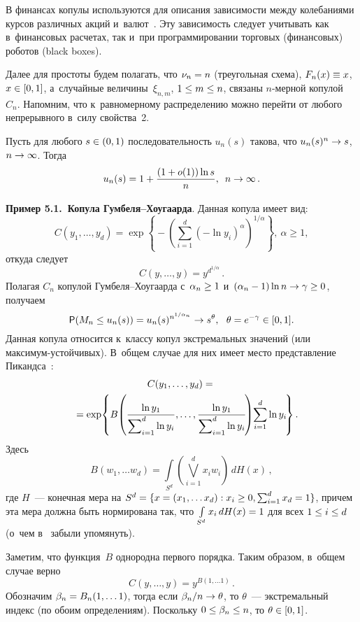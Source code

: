 \begin{multicols}{2}
В финансах копулы используются для описания зависимости между колебаниями курсов различных
акций и~валют~\cite{QRM}. Эту зависимость следует учитывать как в~финансовых расчетах,
 так и~при программировании торговых (финансовых) роботов (black boxes).

Далее для простоты будем полагать, что $\nu_n\hm=n$ (треугольная схема),
$F_n(x)\hm\equiv x$,
$x\hm\in [0,1]$, а~случайные величины~$\xi_{n,m}$, $1\hm\le m\hm\le n$,
связаны $n$-мер\-ной копулой~$C_n$.
Напомним, что к~равномерному распределению можно перейти от любого непрерывного в~силу
свойства~2.

Пусть для любого $s\hm\in (0,1)$ последовательность $u_n(s)$ такова,
что $u_n(s)^n\hm\to s$, $n\hm\to\infty$.
Тогда 
$$
u_n(s)=1+\displaystyle\frac{\displaystyle (1+o(1))\ln s\mathstrut}{\displaystyle n\mathstrut},\enskip n\to\infty\,.
$$

\smallskip

\noindent
\textbf{Пример 5.1.\ Копула Гум\-бе\-ля--Хоу\-га\-ар\-да}.
Данная копула имеет вид:
$$
C(y_1,\dots,y_d)=\exp\left\{\!-\left(\sum\limits_{i=1}^d(-\ln y_i)^\alpha
\right)^{\!\!1/\alpha}\right\}\!,\  \alpha\ge 1,
$$
откуда следует
$$
C(y,\dots,y)=y^{d^{1/\alpha}}\,.
$$
Полагая $C_n$ копулой Гум\-бе\-ля--Хоу\-га\-ар\-да
с~$\alpha_n\hm\ge 1$ и~$(\alpha_n-1)\ln n\hm\to\gamma\hm\ge 0$, получаем
$$
{\sf P}(M_n\le u_n(s))=u_n(s)^{n^{1/\alpha_n}}\to s^\theta,\  \
 \theta=e^{-\gamma}\in [0,1].
 $$
Данная копула относится к~классу копул экстремальных значений
(или мак\-си\-мум-устой\-чи\-вых).
В~общем случае для них имеет место представление
Пикандса~\cite[c. 312, теорема 7.45]{QRM}:
\begin{multline*}
C(y_1,\dots,y_d)={}\\
{}=\exp\!\left\{B\!\left(\fr{\ln y_1}
{\sum\nolimits_{i=1}^d\ln y_i},\dots,
\fr{\ln y_1}{\sum\nolimits_{i=1}^d\ln y_i}\!\right)\!
\sum\limits_{i=1}^d\ln y_i\!\right\}.\hspace*{-8.86847pt}
\end{multline*}
Здесь
$$
B\left(w_1,\dots w_d\right)=\int\limits_{S^d}
\left(\bigvee_{i=1}^d x_iw_i\right)\,dH(x)\,,
$$
где $H$~--- конечная мера на $S^d\hm=\{x=(x_1,\dots x_d): x_i\hm\ge 0,
\sum_{i=1}^d x_d\hm=1\}$, причем эта
мера должна быть нормирована так, что $\int\limits_{S^d}x_i\,dH(x)\hm=1$ для всех
$1\hm\le i\hm\le d$ (о~чем в~\cite{QRM} забыли упомянуть).

Заметим, что функция~$B$ однородна первого порядка. Таким образом,
в~общем случае верно
$$
C(y,\dots,y)=y^{B(1,\dots 1)}\,.
$$
Обозначим $\beta_n\hm=B_n(1,\dots 1)$, тогда если $\beta_n/n\hm\to\theta$,
то $\theta$~--- экстремальный индекс
(по обоим определениям). Поскольку $0\hm\le\beta_n\hm\le n$, то $\theta\hm\in [0,1]$.


\end{multicols}
